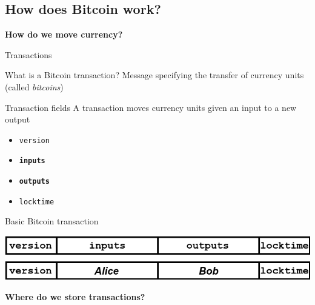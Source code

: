 \documentclass{beamer}
\begin{document}
\subsection{How does Bitcoin work?}
\begin{frame}
 \begin{center}
  \textbf{How do we move currency?}
 \end{center}
\end{frame}
\begin{frame}{Transactions}
 \begin{block}{What is a Bitcoin transaction?}
  Message specifying the transfer of currency units (called \textit{bitcoins})
 \end{block}
 \begin{block}{Transaction fields}
  A transaction moves currency units given an input to a new output
  \begin{itemize}
   \item \texttt{version}
   \item \textbf{\texttt{inputs}}
   \item \textbf{\texttt{outputs}}
   \item \texttt{locktime}
  \end{itemize}
 \end{block}
 \begin{exampleblock}{Basic Bitcoin transaction}
  \begin{center}
   \includegraphics[width=\textwidth, height=0.8\textheight, keepaspectratio]{img/basic_tx.png}
  \end{center}
 \end{exampleblock}
\end{frame}
\begin{frame}
 \begin{center}
  \textbf{Where do we store transactions?}
 \end{center}
\end{frame}
\end{document}
